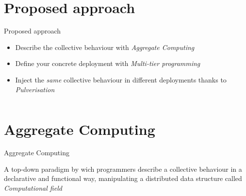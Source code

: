 \documentclass[aspectratio=169]{beamer}
\begin{document}
\section{Proposed approach}
\begin{frame}{Proposed approach}

\begin{cardTiny}
{ 
  \begin{itemize}
    \item<1-> Describe the collective behaviour with {\color{accent} \textit{Aggregate Computing}~\cite{DBLP:journals/jlap/ViroliBDACP19}}
    \item<2-> Define your concrete deployment with {\color{accent} \textit{Multi-tier programming}~\cite{DBLP:journals/csur/WeisenburgerWS20}}
    \item<3-> Inject the {\color{accent} \textit{same}} collective behaviour in different deployments thanks to {\color{accent} \textit{Pulverisation}~\cite{DBLP:journals/fi/CasadeiPPVW20}}
  \end{itemize}
}
\end{cardTiny}
\begin{columns}[onlytextwidth, t]
  \begin{column}{0.27\textwidth}
    \begin{adjustbox}{max width=\textwidth, valign=m, margin=0}
    \end{adjustbox}
  \end{column}
  \begin{column}{0.32\textwidth}
    \begin{adjustbox}{max width=\textwidth, valign=m}
    \end{adjustbox}
  \end{column}
  \begin{column}{0.25\textwidth}
    \begin{adjustbox}{max width=\textwidth, valign=m}
    \end{adjustbox}
  \end{column}
\end{columns}
\end{frame}

\section{Aggregate Computing}
\begin{frame}{Aggregate Computing~\cite{DBLP:journals/jlap/ViroliBDACP19}}
  \begin{cardTiny}
    {
      \color{accent} A top-down paradigm by wich programmers describe 
      a collective behaviour in a declarative and functional way,
      manipulating a distributed data structure called \textit{Computational field} 
    }
  \end{cardTiny}
  \centering
\end{frame}
\end{document}
